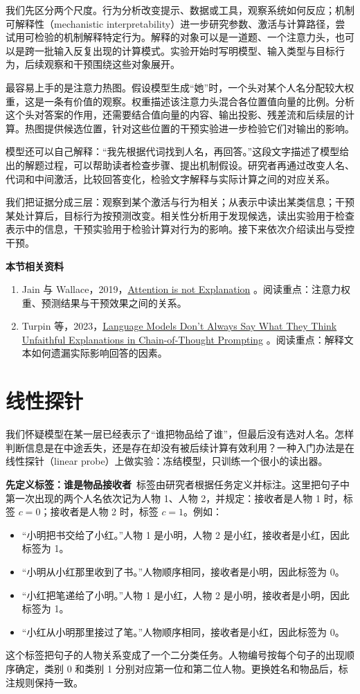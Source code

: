 我们先区分两个尺度。行为分析改变提示、数据或工具，观察系统如何反应；机制可解释性（mechanistic interpretability）进一步研究参数、激活与计算路径，尝试用可检验的机制解释特定行为。解释的对象可以是一道题、一个注意力头，也可以是跨一批输入反复出现的计算模式。实验开始时写明模型、输入类型与目标行为，后续观察和干预围绕这些对象展开。

最容易上手的是注意力热图。假设模型生成``她''时，一个头对某个人名分配较大权重，这是一条有价值的观察。权重描述该注意力头混合各位置值向量的比例。分析这个头对答案的作用，还需要结合值向量的内容、输出投影、残差流和后续层的计算。热图提供候选位置，针对这些位置的干预实验进一步检验它们对输出的影响。

模型还可以自己解释：``我先根据代词找到人名，再回答。''这段文字描述了模型给出的解题过程，可以帮助读者检查步骤、提出机制假设。研究者再通过改变人名、代词和中间激活，比较回答变化，检验文字解释与实际计算之间的对应关系。

我们把证据分成三层：观察到某个激活与行为相关；从表示中读出某类信息；干预某处计算后，目标行为按预测改变。相关性分析用于发现候选，读出实验用于检查表示中的信息，干预实验用于检验计算对行为的影响。接下来依次介绍读出与受控干预。

\textbf{本节相关资料}
\begin{enumerate}
    \item Jain 与 Wallace，2019，\href{https://arxiv.org/abs/1902.10186}{Attention is not Explanation} 。阅读重点：注意力权重、预测结果与干预效果之间的关系。
    \item Turpin 等，2023，\href{https://arxiv.org/abs/2305.04388}{Language Models Don't Always Say What They Think Unfaithful Explanations in Chain-of-Thought Prompting} 。阅读重点：解释文本如何遗漏实际影响回答的因素。
\end{enumerate}

\section{线性探针}\label{线性探针}

我们怀疑模型在某一层已经表示了``谁把物品给了谁''，但最后没有选对人名。怎样判断信息是在中途丢失，还是存在却没有被后续计算有效利用？一种入门办法是在线性探针（linear probe）上做实验：冻结模型，只训练一个很小的读出器。

\textbf{先定义标签：谁是物品接收者}~标签由研究者根据任务定义并标注。这里把句子中第一次出现的两个人名依次记为人物 1、人物 2，并规定：接收者是人物 1 时，标签 $c=0$；接收者是人物 2 时，标签 $c=1$。例如：
\begin{itemize}
    \item ``小明把书交给了小红。''人物 1 是小明，人物 2 是小红，接收者是小红，因此标签为 1。
    \item ``小明从小红那里收到了书。''人物顺序相同，接收者是小明，因此标签为 0。
    \item ``小红把笔递给了小明。''人物 1 是小红，人物 2 是小明，接收者是小明，因此标签为 1。
    \item ``小红从小明那里接过了笔。''人物顺序相同，接收者是小红，因此标签为 0。
\end{itemize}
这个标签把句子的人物关系变成了一个二分类任务。人物编号按每个句子的出现顺序确定，类别 0 和类别 1 分别对应第一位和第二位人物。更换姓名和物品后，标注规则保持一致。

